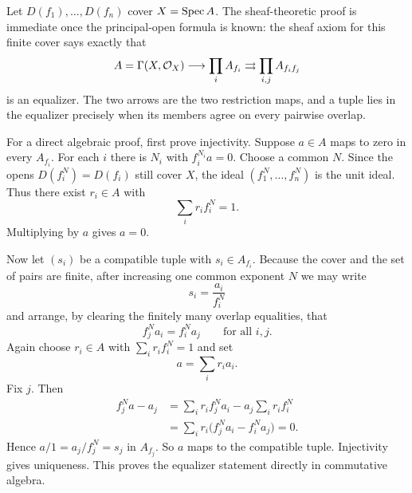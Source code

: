 
\begin{solution}[Challenge VI.17.C1]
Let $D(f_1),\dots,D(f_n)$ cover $X=\operatorname{Spec} A$.  The sheaf-theoretic proof is immediate once the principal-open formula is known: the sheaf axiom for this finite cover says exactly that
\[
A=\Gamma(X,\mathcal O_X)
\longrightarrow
\prod_i A_{f_i}
\rightrightarrows
\prod_{i,j}A_{f_if_j}
\]
is an equalizer.  The two arrows are the two restriction maps, and a tuple lies in the equalizer precisely when its members agree on every pairwise overlap.

For a direct algebraic proof, first prove injectivity.  Suppose $a\in A$ maps to zero in every $A_{f_i}$.  For each $i$ there is $N_i$ with $f_i^{N_i}a=0$.  Choose a common $N$.  Since the opens $D(f_i^N)=D(f_i)$ still cover $X$, the ideal $(f_1^N,\dots,f_n^N)$ is the unit ideal.  Thus there exist $r_i\in A$ with
\[
\sum_i r_i f_i^N=1.
\]
Multiplying by $a$ gives $a=0$.

Now let $(s_i)$ be a compatible tuple with $s_i\in A_{f_i}$.  Because the cover and the set of pairs are finite, after increasing one common exponent $N$ we may write
\[
s_i=\frac{a_i}{f_i^N}
\]
and arrange, by clearing the finitely many overlap equalities, that
\[
f_j^N a_i=f_i^N a_j
\qquad\text{for all }i,j.
\]
Again choose $r_i\in A$ with $\sum_i r_i f_i^N=1$ and set
\[
a=\sum_i r_i a_i.
\]
Fix $j$.  Then
\[
\begin{aligned}
f_j^N a-a_j
&=\sum_i r_i f_j^N a_i-a_j\sum_i r_i f_i^N\\
&=\sum_i r_i\bigl(f_j^N a_i-f_i^N a_j\bigr)=0.
\end{aligned}
\]
Hence $a/1=a_j/f_j^N=s_j$ in $A_{f_j}$.  So $a$ maps to the compatible tuple.  Injectivity gives uniqueness.  This proves the equalizer statement directly in commutative algebra.
\end{solution}

